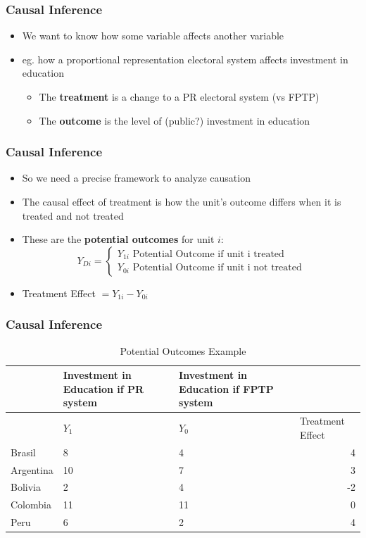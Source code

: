 \documentclass[xcolor=x11names,compress]{beamer}\usepackage[]{graphicx}\usepackage[]{color}
\renewcommand{\(}{\begin{columns}}
\renewcommand{\)}{\end{columns}}
\newcommand{\<}[1]{\begin{column}{#1}}
\renewcommand{\>}{\end{column}}
\begin{document}
\begin{frame}
\frametitle{Causal Inference}
\begin{itemize}
\item We want to know how some variable affects another variable
\item eg. how a proportional representation electoral system affects investment in education
\begin{itemize}
\item The \textbf{treatment} is a change to a PR electoral system (vs FPTP)
\item The \textbf{outcome} is the level of (public?) investment in education
\end{itemize}
\end{itemize}
\end{frame}

\begin{frame}
\frametitle{Causal Inference}
\begin{itemize}
\item So we need a precise framework to analyze causation
\item The causal effect of treatment is how the unit's outcome differs when it is treated and not treated
\item These are the \textbf{potential outcomes} for unit $i$:
\[
Y_{Di} = 
\begin{cases}
Y_{1i}\text{   Potential Outcome if unit i treated} \\
Y_{0i}\text{   Potential Outcome if unit i not treated}
\end{cases}
\]
\item Treatment Effect $ = Y_{1i} - Y_{0i}$
\end{itemize}
\end{frame}

\begin{frame}
\frametitle{Causal Inference}
\begin{table}[htbp]
  \centering
  \caption{Potential Outcomes Example}
    \begin{tabular}{|l|p{2.4cm}|p{2.4cm}|r|}
    \hline
          & \multicolumn{1}{p{2.4cm}|}{Investment in Education if PR system} & \multicolumn{1}{p{2.4cm}|}{Investment in Education if FPTP system} &  \bigstrut\\
    \hline
          & \multicolumn{1}{l|}{$Y_1$} & \multicolumn{1}{l|}{$Y_0$} & \multicolumn{1}{l|}{Treatment Effect} \bigstrut\\
    \hline
    Brasil & 8     & 4     & 4 \bigstrut\\
    \hline
    Argentina & 10    & 7     & 3 \bigstrut\\
    \hline
    Bolivia & 2     & 4     & -2 \bigstrut\\
    \hline
    Colombia & 11    & 11    & 0 \bigstrut\\
    \hline
    Peru & 6     & 2     & 4 \bigstrut\\
    \hline
    \end{tabular}%
  \label{tab:addlabel}%
\end{table}%
\end{frame}
\end{document}
